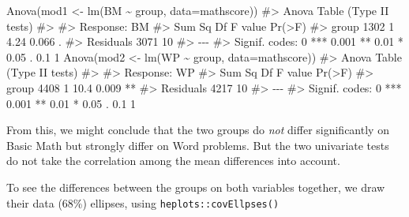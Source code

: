 \documentclass[
  letterpaper,
  10pt,
  krantz2]{krantz}
\makeatletter
\newenvironment{Shaded}{\begin{snugshade}}{\end{snugshade}}
\newcommand{\AttributeTok}[1]{\textcolor[rgb]{0.40,0.45,0.13}{#1}}
\newcommand{\CommentTok}[1]{\textcolor[rgb]{0.37,0.37,0.37}{#1}}
\newcommand{\FunctionTok}[1]{\textcolor[rgb]{0.28,0.35,0.67}{#1}}
\newcommand{\NormalTok}[1]{\textcolor[rgb]{0.00,0.23,0.31}{#1}}
\newcommand{\OtherTok}[1]{\textcolor[rgb]{0.00,0.23,0.31}{#1}}
\newcommand{\SpecialCharTok}[1]{\textcolor[rgb]{0.37,0.37,0.37}{#1}}
\newenvironment{kframe}{%
  \medskip{}
  \setlength{\fboxsep}{.8em}
  \def\at@end@of@kframe{}%
  \ifinner\ifhmode%
  \def\at@end@of@kframe{\end{minipage}}%
  \begin{minipage}{\columnwidth}%
  \fi\fi%
  \def\FrameCommand##1{\hskip\@totalleftmargin \hskip-\fboxsep
  \colorbox{shadecolor}{##1}\hskip-\fboxsep
      \hskip-\linewidth \hskip-\@totalleftmargin \hskip\columnwidth}%
  \MakeFramed {\advance\hsize-\width
    \@totalleftmargin\z@ \linewidth\hsize
    \@setminipage}}%
{\par\unskip\endMakeFramed%
  \at@end@of@kframe}
\renewenvironment{Shaded}{\begin{kframe}}{\end{kframe}}
\makeatother
\begin{document}
\begin{Shaded}
\begin{Highlighting}[]
\FunctionTok{Anova}\NormalTok{(mod1 }\OtherTok{\textless{}{-}} \FunctionTok{lm}\NormalTok{(BM }\SpecialCharTok{\textasciitilde{}}\NormalTok{ group, }\AttributeTok{data=}\NormalTok{mathscore))}
\CommentTok{\#\textgreater{} Anova Table (Type II tests)}
\CommentTok{\#\textgreater{} }
\CommentTok{\#\textgreater{} Response: BM}
\CommentTok{\#\textgreater{}           Sum Sq Df F value Pr(\textgreater{}F)  }
\CommentTok{\#\textgreater{} group       1302  1    4.24  0.066 .}
\CommentTok{\#\textgreater{} Residuals   3071 10                 }
\CommentTok{\#\textgreater{} {-}{-}{-}}
\CommentTok{\#\textgreater{} Signif. codes:  0 \textquotesingle{}***\textquotesingle{} 0.001 \textquotesingle{}**\textquotesingle{} 0.01 \textquotesingle{}*\textquotesingle{} 0.05 \textquotesingle{}.\textquotesingle{} 0.1 \textquotesingle{} \textquotesingle{} 1}
\FunctionTok{Anova}\NormalTok{(mod2 }\OtherTok{\textless{}{-}} \FunctionTok{lm}\NormalTok{(WP }\SpecialCharTok{\textasciitilde{}}\NormalTok{ group, }\AttributeTok{data=}\NormalTok{mathscore))}
\CommentTok{\#\textgreater{} Anova Table (Type II tests)}
\CommentTok{\#\textgreater{} }
\CommentTok{\#\textgreater{} Response: WP}
\CommentTok{\#\textgreater{}           Sum Sq Df F value Pr(\textgreater{}F)   }
\CommentTok{\#\textgreater{} group       4408  1    10.4  0.009 **}
\CommentTok{\#\textgreater{} Residuals   4217 10                  }
\CommentTok{\#\textgreater{} {-}{-}{-}}
\CommentTok{\#\textgreater{} Signif. codes:  0 \textquotesingle{}***\textquotesingle{} 0.001 \textquotesingle{}**\textquotesingle{} 0.01 \textquotesingle{}*\textquotesingle{} 0.05 \textquotesingle{}.\textquotesingle{} 0.1 \textquotesingle{} \textquotesingle{} 1}
\end{Highlighting}
\end{Shaded}

From this, we might conclude that the two groups do \emph{not} differ
significantly on Basic Math but strongly differ on Word problems. But
the two univariate tests do not take the correlation among the mean
differences into account.

To see the differences between the groups on both variables together, we
draw their data (68\%) ellipses, using \texttt{heplots::covEllpses()}
\end{document}

